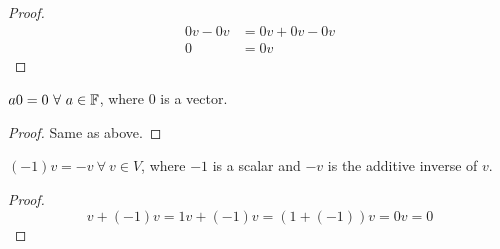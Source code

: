 \documentclass[../main.tex]{subfiles}
\begin{document}
\begin{itemize}
\begin{theorem}
\begin{proof}
\begin{align*}
                0v-0v &= 0v+0v-0v\\
                0 &= 0v
            \end{align*}
        \end{proof}
    \end{theorem}
    \begin{theorem}
        $a0=0\ \forall\ a\in\mathbb{F}$, where $0$ is a vector.
        \begin{proof}
            Same as above.
        \end{proof}
    \end{theorem}
    \begin{theorem}
        $(-1)v=-v\ \forall\ v\in V$, where $-1$ is a scalar and $-v$ is the additive inverse of $v$.
        \begin{proof}
            \begin{equation*}
                v+(-1)v=1v+(-1)v=(1+(-1))v=0v=0
            \end{equation*}
        \end{proof}
    \end{theorem}
\end{itemize}
\end{document}
